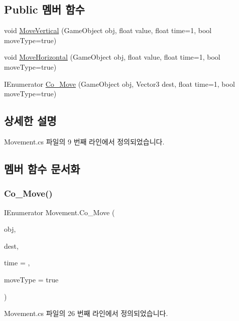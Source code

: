 \subsection*{Public 멤버 함수}
\begin{DoxyCompactItemize}
\item 
void \mbox{\hyperlink{class_movement_a2984f510496fd8a5df663ad68e0fab17}{Move\+Vertical}} (Game\+Object obj, float value, float time=1, bool move\+Type=true)
\item 
void \mbox{\hyperlink{class_movement_a35adeccf74f9c659ac5c15f6ef239919}{Move\+Horizontal}} (Game\+Object obj, float value, float time=1, bool move\+Type=true)
\item 
I\+Enumerator \mbox{\hyperlink{class_movement_a661f659a82b0817b3f60d6d8eb75edbf}{Co\+\_\+\+Move}} (Game\+Object obj, Vector3 dest, float time=1, bool move\+Type=true)
\end{DoxyCompactItemize}


\subsection{상세한 설명}


Movement.\+cs 파일의 9 번째 라인에서 정의되었습니다.



\subsection{멤버 함수 문서화}
\mbox{\label{class_movement_a661f659a82b0817b3f60d6d8eb75edbf}} 
\subsubsection{\texorpdfstring{Co\_Move()}{Co\_Move()}}
{\footnotesize\ttfamily I\+Enumerator Movement.\+Co\+\_\+\+Move (\begin{DoxyParamCaption}\item[{Game\+Object}]{obj,  }\item[{Vector3}]{dest,  }\item[{float}]{time = {},  }\item[{bool}]{move\+Type = {\ttfamily true} }\end{DoxyParamCaption})}



Movement.\+cs 파일의 26 번째 라인에서 정의되었습니다.



